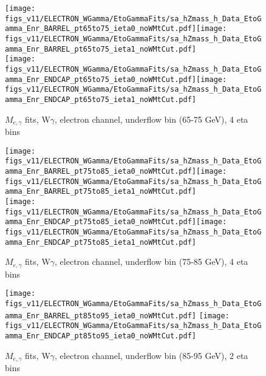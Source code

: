 \begin{figure}[htb]
  \begin{center}
   \texttt{[image: figs\_v11/ELECTRON\_WGamma/EtoGammaFits/sa\_hZmass\_h\_Data\_EtoGamma\_Enr\_BARREL\_pt65to75\_ieta0\_noWMtCut.pdf]}\texttt{[image: figs\_v11/ELECTRON\_WGamma/EtoGammaFits/sa\_hZmass\_h\_Data\_EtoGamma\_Enr\_BARREL\_pt65to75\_ieta1\_noWMtCut.pdf]}\\
   \texttt{[image: figs\_v11/ELECTRON\_WGamma/EtoGammaFits/sa\_hZmass\_h\_Data\_EtoGamma\_Enr\_ENDCAP\_pt65to75\_ieta0\_noWMtCut.pdf]}\texttt{[image: figs\_v11/ELECTRON\_WGamma/EtoGammaFits/sa\_hZmass\_h\_Data\_EtoGamma\_Enr\_ENDCAP\_pt65to75\_ieta1\_noWMtCut.pdf]}\\
  \label{fig:etogFits_65to75}
  \caption{$M_{e,\gamma}$ fits, W$\gamma$, electron channel, underflow bin (65-75 GeV), 4 eta bins}
  \end{center}
\end{figure}


\begin{figure}[htb]
  \begin{center}
   \texttt{[image: figs\_v11/ELECTRON\_WGamma/EtoGammaFits/sa\_hZmass\_h\_Data\_EtoGamma\_Enr\_BARREL\_pt75to85\_ieta0\_noWMtCut.pdf]}\texttt{[image: figs\_v11/ELECTRON\_WGamma/EtoGammaFits/sa\_hZmass\_h\_Data\_EtoGamma\_Enr\_BARREL\_pt75to85\_ieta1\_noWMtCut.pdf]}\\
   \texttt{[image: figs\_v11/ELECTRON\_WGamma/EtoGammaFits/sa\_hZmass\_h\_Data\_EtoGamma\_Enr\_ENDCAP\_pt75to85\_ieta0\_noWMtCut.pdf]}\texttt{[image: figs\_v11/ELECTRON\_WGamma/EtoGammaFits/sa\_hZmass\_h\_Data\_EtoGamma\_Enr\_ENDCAP\_pt75to85\_ieta1\_noWMtCut.pdf]}\\
  \label{fig:etogFits_75to85}
  \caption{$M_{e,\gamma}$ fits, W$\gamma$, electron channel, underflow bin (75-85 GeV), 4 eta bins}
  \end{center}
\end{figure}

\begin{figure}[htb]
  \begin{center}
   \texttt{[image: figs\_v11/ELECTRON\_WGamma/EtoGammaFits/sa\_hZmass\_h\_Data\_EtoGamma\_Enr\_BARREL\_pt85to95\_ieta0\_noWMtCut.pdf]}
   \texttt{[image: figs\_v11/ELECTRON\_WGamma/EtoGammaFits/sa\_hZmass\_h\_Data\_EtoGamma\_Enr\_ENDCAP\_pt85to95\_ieta0\_noWMtCut.pdf]}\\
  \label{fig:etogFits_85to95}
  \caption{$M_{e,\gamma}$ fits, W$\gamma$, electron channel, underflow bin (85-95 GeV), 2 eta bins}
  \end{center}
\end{figure}

